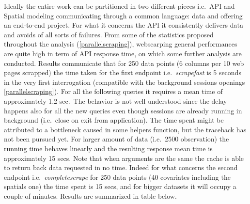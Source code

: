 \documentclass[
  12pt,
  a4paper,
  oneside]{book}
\theoremstyle{definition}
\theoremstyle{definition}
\theoremstyle{definition}
\theoremstyle{remark}
\begin{document}
Ideally the entire work can be partitioned in two different pieces i.e.~API and Spatial modeling communicating through a common language: data and offering an end-to-end project. For what it concerns the API it consistently delivers data and avoids of all sorts of failures. From some of the statistics proposed throughout the analysis (\ref{parallelscraping}), webscarping general performances are quite high in term of API response time, on which some further analysis are conducted. Results communicate that for 250 data points (6 columns per 10 web pages scrapped) the time taken for the first endpoint i.e.~\emph{scrapefast} is 5 seconds in the very first interrogation (compatible with the background sessions openings \ref{parallelscraping}). For all the following queries it requires a mean time of approximately 1.2 sec.~The behavior is not well understood since the delay happens also for all the new queries even though sessions are already running in background (i.e.~close on exit from application). The time spent might be attributed to a bottleneck caused in some helpers function, but the traceback has not been pursued yet. For larger amount of data (i.e.~2500 observation) the running time behaves linearly and the resulting response mean time is approximately 15 secs. Note that when arguments are the same the cache is able to return back data requested in no time.
Indeed for what concerns the second endpoint i.e.~\emph{completescrape} for 250 data points (40 covariates including the spatials one) the time spent is 15 secs, and for bigger datasets it will occupy a couple of minutes. Results are summarized in table below.
\end{document}
